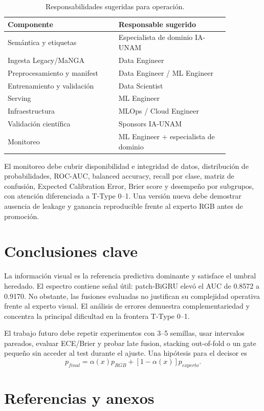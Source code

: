 \documentclass[letterpaper,11pt]{article}
\begin{document}
\begin{table}[H]\centering
\caption{Responsabilidades sugeridas para operación.}
\begin{tabular}{p{0.43\linewidth}p{0.43\linewidth}}\toprule
Componente & Responsable sugerido\\\midrule
Semántica y etiquetas & Especialista de dominio IA-UNAM\\
Ingesta Legacy/MaNGA & Data Engineer\\
Preprocesamiento y manifest & Data Engineer / ML Engineer\\
Entrenamiento y validación & Data Scientist\\
Serving & ML Engineer\\
Infraestructura & MLOps / Cloud Engineer\\
Validación científica & Sponsors IA-UNAM\\
Monitoreo & ML Engineer + especialista de dominio\\\bottomrule
\end{tabular}\end{table}

El monitoreo debe cubrir disponibilidad e integridad de datos, distribución de probabilidades, ROC-AUC, balanced accuracy, recall por clase, matriz de confusión, Expected Calibration Error, Brier score y desempeño por subgrupos, con atención diferenciada a T-Type 0--1. Una versión nueva debe demostrar ausencia de leakage y ganancia reproducible frente al experto RGB antes de promoción.

\section{Conclusiones clave}
La información visual es la referencia predictiva dominante y satisface el umbral heredado. El espectro contiene señal útil: patch-BiGRU elevó el AUC de 0.8572 a 0.9170. No obstante, las fusiones evaluadas no justifican su complejidad operativa frente al experto visual. El análisis de errores demuestra complementariedad y concentra la principal dificultad en la frontera T-Type 0--1.

El trabajo futuro debe repetir experimentos con 3--5 semillas, usar intervalos pareados, evaluar ECE/Brier y probar late fusion, stacking out-of-fold o un gate pequeño sin acceder al test durante el ajuste. Una hipótesis para el decisor es
\[
p_{final}=\alpha(x)p_{RGB}+[1-\alpha(x)]p_{experto}.
\]

\section{Referencias y anexos}
\printbibliography[heading=none]
\end{document}
